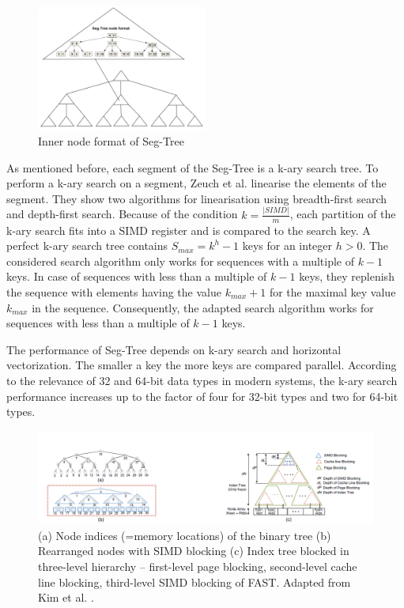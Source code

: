 \documentclass[conference]{IEEEtran}
\begin{document}
\begin{figure}
	\includegraphics[width=0.5\textwidth]{figure_2.png}
	\caption{Inner node format of Seg-Tree}
	\label{fig}
\end{figure}

As mentioned before, each segment of the Seg-Tree is a k-ary search tree. To perform a k-ary search on a segment, Zeuch et al. linearise the elements of the segment. They show two algorithms for linearisation using breadth-first search and depth-first search. Because of the condition $k = \frac{\vert SIMD \vert }{m}$, each partition of the k-ary search fits into a SIMD register and is compared to the search key. A perfect k-ary search tree contains  $S_{max} = k^h - 1$ keys for an integer $h > 0$. The considered search algorithm only works for sequences with a multiple of $k-1$ keys. In case of  sequences with less than a multiple of $k-1$ keys, they replenish the sequence with elements having the value $k_{max} + 1$ for the maximal key value $k_{max}$ in the sequence. Consequently, the adapted search algorithm works for sequences with less than a multiple of $k-1$ keys.

The performance of Seg-Tree depends on k-ary search and horizontal vectorization. The smaller a key the more keys are compared parallel. According to the relevance of 32 and 64-bit data types in modern systems, the k-ary search performance increases up to the factor of four for 32-bit types and two for 64-bit types.

\begin{figure}
	\includegraphics[width=1.0\textwidth]{figure_3.png}
	\caption{(a) Node indices (=memory locations) of the binary tree (b) Rearranged nodes with SIMD blocking (c) Index tree blocked in three-level
		hierarchy – first-level page blocking, second-level cache line blocking, third-level SIMD blocking of FAST. Adapted from Kim et al. \cite{b6}.}
	\label{fig}
\end{figure}
\end{document}
